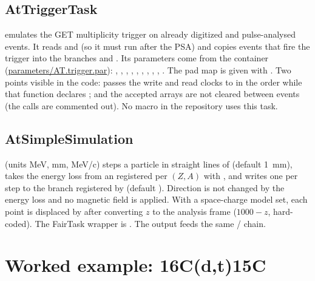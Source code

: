 \subsection{AtTriggerTask}

 emulates the GET multiplicity trigger on already digitized and
pulse-analysed events. It reads  and  (so it must run after the PSA)
and copies events that fire the trigger into the branches  and
. Its parameters come from the container 
(\url{parameters/AT.trigger.par}): , , ,
, , ,
, ,
, . The pad map is given with
. Two points visible in the code:  passes the write and read clocks
to  in the order  while that function
declares ; and the accepted arrays are not cleared between events (the
 calls are commented out). No macro in the repository uses this task.

\subsection{AtSimpleSimulation}
\label{sec:sim:simple}

 (units MeV, mm, MeV/c) steps a particle in straight lines of
 (default 1~mm), takes the energy loss from an 
registered per $(Z,A)$ with , and writes one  per step
to the branch registered by  (default ). Direction is not
changed by the energy loss and no magnetic field is applied. With a space-charge model set, each
point is displaced by  after converting $z$ to the analysis frame
($1000-z$, hard-coded). The FairTask wrapper is . The output feeds the same
/ chain.

\section{Worked example: 16C(d,t)15C}
\label{sec:sim:example}

